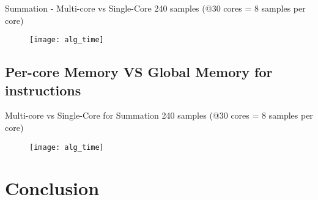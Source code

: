 \documentclass[aspectratio=169]{beamer}
\begin{document}
\begin{frame}{Summation - Multi-core vs Single-Core}
240 samples (@30 cores = 8 samples per core)
\begin{figure}
    \centering
    \texttt{[image: alg\_time]}
\end{figure}
\end{frame}

\subsection{Per-core Memory VS Global Memory for instructions}
\begin{frame}{Multi-core vs Single-Core for Summation}
240 samples (@30 cores = 8 samples per core)
\begin{figure}
    \centering
    \texttt{[image: alg\_time]}
\end{figure}
\end{frame}


\section{Conclusion}
\frame{\tableofcontents[currentsection, subsectionstyle=show/show/hide]}
\end{document}
